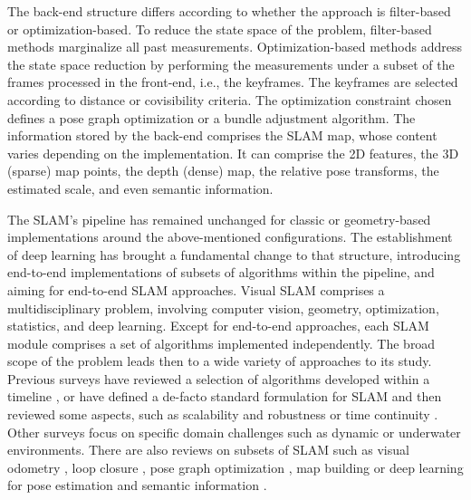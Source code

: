 The back-end structure differs according to whether the approach is filter-based or optimization-based. 
To reduce the state space of the problem, filter-based methods marginalize all past measurements. Optimization-based methods address the state space reduction by performing the measurements under a subset of the frames processed in the front-end, i.e., the keyframes. The keyframes are selected according to distance or covisibility criteria. 
The optimization constraint chosen defines a pose graph optimization or a bundle adjustment algorithm. The information stored by the back-end comprises the \ac{SLAM} map, whose content varies depending on the implementation. It can comprise the 2D features, the 3D (sparse) map points, the depth (dense) map, the relative pose transforms, the estimated scale, and even semantic information.

The SLAM's pipeline has remained unchanged for classic or geometry-based implementations around the above-mentioned configurations. The establishment of deep learning has brought
a fundamental change to that structure, introducing end-to-end implementations of subsets of algorithms within the pipeline, and aiming for end-to-end SLAM approaches.
Visual \ac{SLAM} comprises a multidisciplinary problem, involving computer vision, geometry, optimization, statistics, and deep learning. Except for end-to-end approaches, each SLAM module comprises a set of algorithms implemented independently. The broad scope of the problem leads then to a wide variety of approaches to its study. Previous surveys have reviewed a selection of algorithms developed within a timeline \cite{intro:survey:2010to2016}, or have defined a de-facto standard formulation for SLAM and then reviewed some aspects, such as scalability  and robustness \cite{intro:survey:robust} or time continuity \cite{intro:survey:yan2019flow}. Other surveys focus on specific domain challenges such as dynamic \cite{intro:survey:dynamicenvs} or underwater \cite{intro:survey:uwvisualslam} environments. There are also reviews on subsets of SLAM such as visual odometry \cite{intro:survey:scaramuzza2011visualodomtut,intro:survey:VODL}, loop closure \cite{intro:survey:loopclosure}, pose graph optimization \cite{intro:survey:carlone2015initialization}, map building \cite{intro:survey:geomap, intro:survey:3dmap} or deep learning for pose estimation and semantic information \cite{intro:survey:DLSLAMreview18, intro:survey:semantic20}.

